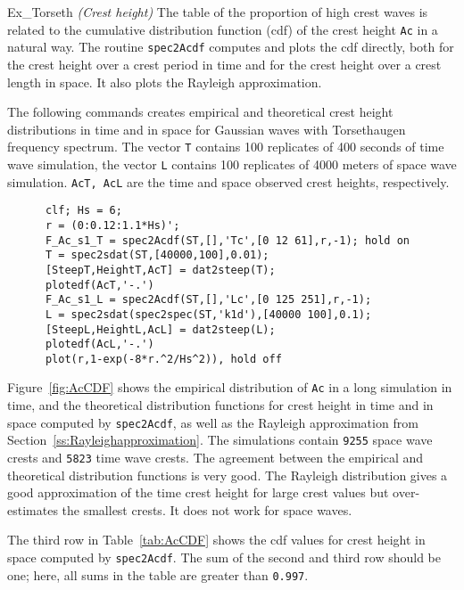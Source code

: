 \begin{cex}{Ex_Torseth} {\sl (Crest height)}\label{pageTorsethCrestHeight}
The table of the proportion of high crest waves is related
to the cumulative distribution function (cdf) of the crest height {\tt Ac}
in a natural way. The routine {\tt spec2Acdf} computes and plots
the cdf directly, both for the crest height over a crest period in time
and for the crest height over a crest length in space. It also plots the Rayleigh approximation. 

The following commands creates empirical and theoretical crest height distributions 
in time and in space for Gaussian waves with Torsethaugen frequency spectrum. 
The vector {\tt T} contains 100 replicates of 400 seconds of time wave simulation, the vector 
{\tt L} contains 100 replicates of 4000 meters of space wave simulation. {\tt AcT, AcL} 
are the time and space observed crest heights, respectively.  
{\small\begin{verbatim}
      clf; Hs = 6;
      r = (0:0.12:1.1*Hs)';
      F_Ac_s1_T = spec2Acdf(ST,[],'Tc',[0 12 61],r,-1); hold on
      T = spec2sdat(ST,[40000,100],0.01);
      [SteepT,HeightT,AcT] = dat2steep(T);
      plotedf(AcT,'-.')
      F_Ac_s1_L = spec2Acdf(ST,[],'Lc',[0 125 251],r,-1);
      L = spec2sdat(spec2spec(ST,'k1d'),[40000 100],0.1);
      [SteepL,HeightL,AcL] = dat2steep(L);
      plotedf(AcL,'-.')
      plot(r,1-exp(-8*r.^2/Hs^2)), hold off
\end{verbatim}}

Figure~\ref{fig:AcCDF}
shows the empirical distribution of {\tt Ac} in a long simulation in time,
and the theoretical distribution functions for crest height
in time and in space computed by {\tt spec2Acdf}, as well as the Rayleigh approximation from
Section~\ref{ss:Rayleighapproximation}. The simulations contain {\tt 9255}
space wave crests and {\tt 5823} time wave crests. The agreement between the
empirical and theoretical distribution functions is very good. 
The Rayleigh distribution gives a good approximation of the time crest height 
for large crest values but over-estimates the smallest crests. 
It does not work 
for space waves.

The third row in Table~\ref{tab:AcCDF}
shows the cdf values for crest height in space computed by {\tt spec2Acdf}.
The sum of the second and third row should be one; here, 
all sums in the table are greater than {\tt 0.997}.
\end{cex}

